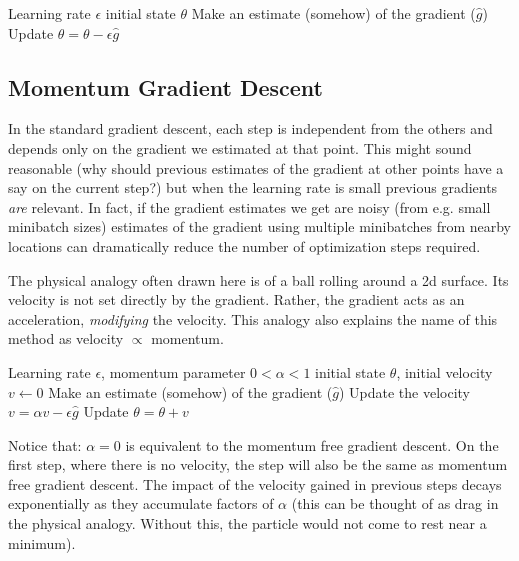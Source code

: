 \documentclass{article}
\begin{document}
\begin{algorithm}
\begin{algorithmic}
    \Require Learning rate $\epsilon$
    \Require initial state $\theta$
    \While{---}
        \State Make an estimate (somehow) of the gradient ($\hat{g}$)
        \State Update $\theta = \theta - \epsilon \hat{g}$
    \EndWhile
\end{algorithmic}
\end{algorithm}

\subsection{Momentum Gradient Descent}

In the standard gradient descent, each step is independent from the others and depends only on the gradient we estimated at that point. This might sound reasonable (why should previous estimates of the gradient at other points have a say on the current step?) but when the learning rate is small previous gradients {\em are} relevant. In fact, if the gradient estimates we get are noisy (from e.g. small minibatch sizes) estimates of the gradient using multiple minibatches from nearby locations can dramatically reduce the number of optimization steps required.

The physical analogy often drawn here is of a ball rolling around a 2d surface. Its velocity is not set directly by the gradient. Rather, the gradient acts as an acceleration, {\em modifying} the velocity. This analogy also explains the name of this method as velocity $\propto$ momentum.

\begin{algorithm}
\begin{algorithmic}
    \Require Learning rate $\epsilon$, momentum parameter $0 < \alpha < 1$
    \Require initial state $\theta$, initial velocity $v \gets 0$
    \While{---}
        \State Make an estimate (somehow) of the gradient ($\hat{g}$)
        \State Update the velocity $v = \alpha v - \epsilon \hat{g}$
        \State Update $\theta = \theta + v$
    \EndWhile
\end{algorithmic}
\end{algorithm}

Notice that: $\alpha = 0$ is equivalent to the momentum free gradient descent. On the first step, where there is no velocity, the step will also be the same as momentum free gradient descent. The impact of the velocity gained in previous steps decays exponentially as they accumulate factors of $\alpha$ (this can be thought of as drag in the physical analogy. Without this, the particle would not come to rest near a minimum).
\end{document}
